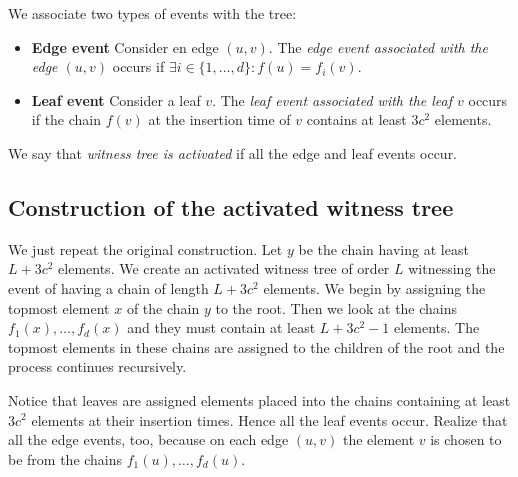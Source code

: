 \begin{definition}
We associate two types of events with the tree:
\begin{itemize}
	\item \textbf{Edge event} Consider en edge $(u, v)$. The \emph{edge event associated with the edge $(u, v)$} occurs if $\exists i \in \{1, \dots, d \} \colon f(u) = f_i(v)$.
	\item \textbf{Leaf event} Consider a leaf $v$. The \emph{leaf event associated with the leaf $v$} occurs if the chain $f(v)$ at the insertion time of $v$ contains at least $3c^2$ elements.
\end{itemize}

We say that \emph{witness tree is activated} if all the edge and leaf events occur.
\end{definition}

\subsection{Construction of the activated witness tree}
We just repeat the original construction. 
Let $y$ be the chain having at least $L + 3c^2$ elements. 
We create an activated witness tree of order $L$ witnessing the event of having a chain of length $L + 3c^2$ elements.
We begin by assigning the topmost element $x$ of the chain $y$ to the root. 
Then we look at the chains $f_1(x), \dots, f_d(x)$ and they must contain at least $L + 3c^2 - 1$ elements. 
The topmost elements in these chains are assigned to the children of the root and the process continues recursively. 

Notice that leaves are assigned elements placed into the chains containing at least $3c^2$ elements at their insertion times.
Hence all the leaf events occur.
Realize that all the edge events, too, because on each edge $(u, v)$ the element $v$ is chosen to be from the chains $f_1(u), \dots, f_d(u)$.


